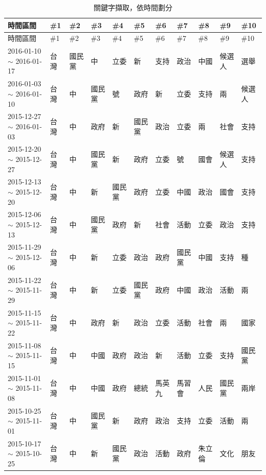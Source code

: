 \documentclass[a4paper, 10pt, conference]{ieeeconf}       %
\begin{document}
\begin{CJK}{UTF8}{bsmi}
\begin{longtable}[c]{@{}L{2.45cm}L{1.1cm}L{1.1cm}L{1.1cm}L{1.1cm}L{1.1cm}L{1.1cm}L{1.1cm}L{1.1cm}L{1.1cm}L{1.1cm}@{}}
\caption{關鍵字擷取，依時間劃分}
\label{t3}\\
\toprule
時間區間 & \#1 & \#2 & \#3 & \#4 & \#5 & \#6 & \#7 & \#8 & \#9 & \#10 \\* \midrule
\endfirsthead
\toprule
時間區間 & \#1 & \#2 & \#3 & \#4 & \#5 & \#6 & \#7 & \#8 & \#9 & \#10 \\* \midrule
\endhead
%
\bottomrule
\endfoot
%
\endlastfoot
%
2016-01-10\newline $\sim$ 2016-01-17 & 台灣 & 國民黨 & 中 & 立委 & 新 & 支持 & 政治 & 中國 & 候選人 & 選舉 \\
2016-01-03\newline $\sim$ 2016-01-10 & 台灣 & 中 & 國民黨 & 號 & 政府 & 新 & 立委 & 支持 & 兩 & 候選人 \\
2015-12-27\newline $\sim$ 2016-01-03 & 台灣 & 中 & 政府 & 新 & 國民黨 & 政治 & 立委 & 兩 & 社會 & 支持 \\
2015-12-20\newline $\sim$ 2015-12-27 & 台灣 & 中 & 國民黨 & 新 & 政府 & 立委 & 號 & 國會 & 候選人 & 支持 \\
2015-12-13\newline $\sim$ 2015-12-20 & 台灣 & 中 & 新 & 國民黨 & 政府 & 立委 & 中國 & 政治 & 國會 & 支持 \\
2015-12-06\newline $\sim$ 2015-12-13 & 台灣 & 中 & 國民黨 & 政府 & 新 & 社會 & 活動 & 立委 & 政治 & 支持 \\
2015-11-29\newline $\sim$ 2015-12-06 & 台灣 & 中 & 新 & 立委 & 政治 & 政府 & 國民黨 & 中國 & 支持 & 種 \\
2015-11-22\newline $\sim$ 2015-11-29 & 台灣 & 中 & 新 & 立委 & 國民黨 & 政府 & 中國 & 政治 & 活動 & 兩 \\
2015-11-15\newline $\sim$ 2015-11-22 & 台灣 & 中 & 政府 & 新 & 政治 & 立委 & 活動 & 社會 & 兩 & 國家 \\
2015-11-08\newline $\sim$ 2015-11-15 & 台灣 & 中 & 中國 & 政府 & 政治 & 新 & 活動 & 立委 & 支持 & 國民黨 \\
2015-11-01\newline $\sim$ 2015-11-08 & 台灣 & 中 & 中國 & 政府 & 總統 & 馬英九 & 馬習會 & 人民 & 國民黨 & 兩岸 \\
2015-10-25\newline $\sim$ 2015-11-01 & 台灣 & 中 & 國民黨 & 新 & 政府 & 政治 & 支持 & 立委 & 活動 & 兩 \\
2015-10-17\newline $\sim$ 2015-10-25 & 台灣 & 中 & 新 & 國民黨 & 政治 & 活動 & 政府 & 朱立倫 & 文化 & 朋友 \\* \bottomrule
\end{longtable}


\end{CJK}
\end{document}
